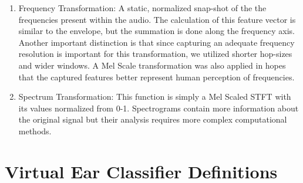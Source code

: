 \documentclass[runningheads,a4paper]{llncs}
\begin{document}
\begin{appendices}
\begin{enumerate}
\item Frequency Transformation: A static, normalized snap-shot of the the frequencies present within the audio. The calculation of this feature vector is similar to the envelope, but the summation is done along the frequency axis. Another important distinction is that since capturing an adequate frequency resolution is important for this transformation, we utilized shorter hop-sizes and wider windows. A Mel Scale transformation was also applied in hopes that the captured features better represent human perception of frequencies. 
\item Spectrum Transformation: This function is simply a Mel Scaled STFT with its values normalized from 0-1. Spectrograms contain more information about the original signal but their analysis requires more complex computational methods.
\end{enumerate}

\chapter{Virtual Ear Classifier Definitions}
\label{appendix:classifier_definitions}

\end{appendices}
\end{document}
